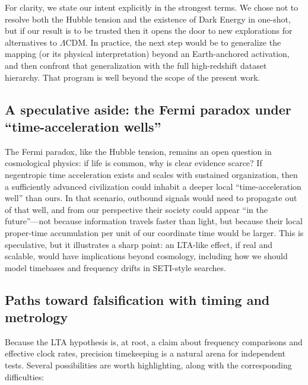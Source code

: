 \documentclass[10pt]{article}
\begin{document}
For clarity, we state our intent explicitly in the strongest terms. We chose not to resolve
both the Hubble tension and the existence of Dark Energy in one-shot, but if our result is to be
trusted then it opens the door to new explorations for alternatives to $\Lambda$CDM. In practice, the next
step would be to generalize the mapping (or its physical interpretation) beyond an Earth-anchored
activation, and then confront that generalization with the full high-redshift dataset hierarchy.
That program is well beyond the scope of the present work.

\subsection{A speculative aside: the Fermi paradox under ``time-acceleration wells''}
The Fermi paradox, like the Hubble tension, remains an open question in cosmological physics: if
life is common, why is clear evidence scarce? If negentropic time acceleration exists and scales
with sustained organization, then a sufficiently advanced civilization could inhabit a deeper local
``time-acceleration well'' than ours. In that scenario, outbound signals would need to propagate
out of that well, and from our perspective their society could appear ``in the future''—not because
information travels faster than light, but because their local proper-time accumulation per unit of
our coordinate time would be larger. This is speculative, but it illustrates a sharp point: an
LTA-like effect, if real and scalable, would have implications beyond cosmology, including how we
should model timebases and frequency drifts in SETI-style searches.

\subsection{Paths toward falsification with timing and metrology}
Because the LTA hypothesis is, at root, a claim about frequency comparisons and effective clock
rates, precision timekeeping is a natural arena for independent tests. Several possibilities are
worth highlighting, along with the corresponding difficulties:
\end{document}
